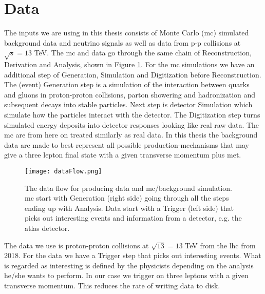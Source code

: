 \documentclass[a4paper, american, 12pt]{report}
\begin{document}
	\section{Data}
	\label{sect:Method-Data}
	The inputs we are using in this thesis consists of Monte Carlo (\acrshort{mc}) simulated background data and neutrino signals as well as data from p-p collisions at $\sqrt{s}=13$ TeV. The \acrshort{mc} and data go through the same chain of Reconstruction, Derivation and Analysis, shown in Figure \ref{fig:DataFlow}. For the \acrshort{mc} simulations we have an additional step of Generation, Simulation and Digitization before Reconstruction. The (event) Generation step is a simulation of the interaction between quarks and gluons in proton-proton collisions, parton showering and hadronization and subsequent decays into stable particles. Next step is detector Simulation which simulate how the particles interact with the detector. The Digitization step turns simulated energy deposits into detector responses looking like real raw data. The \acrshort{mc} are from here on treated similarly as real data. In this thesis the background data are made to best represent all possible production-mechanisms that may give a three lepton final state with a given transverse momentum plus \acrshort{met}.
	\begin{figure}[htb!]
		\hspace*{-0.8cm}
		\centering\texttt{[image: dataFlow.png]}
		\caption[Data flow for producing data and \acrshort{mc}.]{The data flow for producing data and \acrshort{mc}/background simulation. \acrshort{mc} start with Generation (right side) going through all the steps ending up with Analysis. Data start with a Trigger (left side) that picks out interesting events and information from a detector, e.g. the \acrshort{atlas} detector. \label{fig:DataFlow}}
	\end{figure}

	The data we use is proton-proton collisions at $\sqrt{13}=13$ TeV from the \acrshort{lhc} from 2018. For the data we have a Trigger step that picks out interesting events. What is regarded as interesting is defined by the physicists depending on the analysis he/she wants to perform. In our case we trigger on three leptons with a given transverse momentum. This reduces the rate of writing data to disk. 
	
\end{document}
